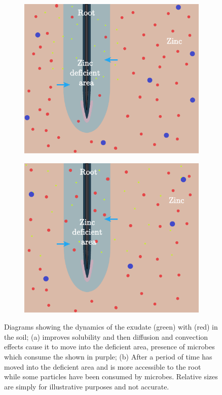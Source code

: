 \documentclass[11pt]{article}
\numberwithin{equation}{section}
\begin{document}
\begin{figure}[h]
\centering
\begin{subfigure}[t]{0.35\textwidth}
    \includegraphics[width=\textwidth]{Figures/RootZincDiagram.pdf}
    \caption{}
    \label{fig:Zinc}
\end{subfigure}
\qquad
\begin{subfigure}[t]{0.35\textwidth}
    \includegraphics[width=\textwidth]{Figures/RootZincDiagram2.pdf}
    \caption{}
    \label{fig:my_label}
\end{subfigure}
\caption{Diagrams showing the dynamics of the exudate  (green) with  (red) in the soil; (a)  improves  solubility and  then diffusion and convection effects cause it to move into the deficient area, presence of microbes which consume the  shown in purple; (b) After a period of time  has moved into the deficient area and is more accessible to the root while some  particles have been consumed by microbes. Relative sizes are simply for illustrative purposes and not accurate.}
\end{figure}
\end{document}
